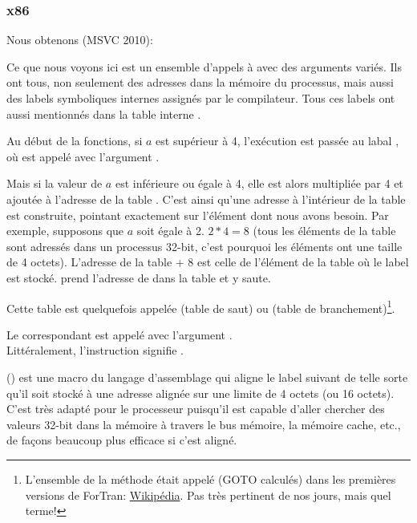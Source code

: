 \subsubsection{x86}


Nous obtenons (MSVC 2010):




Ce que nous voyons ici est un ensemble d'appels à \printf avec des arguments variés.
Ils ont tous, non seulement des adresses dans la mémoire du processus, mais aussi
des labels symboliques internes assignés par le compilateur.
Tous ces labels ont aussi mentionnés dans la table interne .

Au début de la fonctions, si $a$ est supérieur à 4, l'exécution est passée au
labal , où \printf est appelé avec l'argument .

Mais si la valeur de $a$ est inférieure ou égale à 4, elle est alors multipliée
par 4 et ajoutée à l'adresse de la table . C'est ainsi qu'une adresse
à l'intérieur de la table est construite, pointant exactement sur l'élément dont
nous avons besoin. Par exemple, supposons que $a$ soit égale à 2. $2*4 = 8$ (tous
les éléments de la table sont adressés dans un processus 32-bit, c'est pourquoi les
éléments ont une taille de 4 octets).
L'adresse de la table  + 8 est celle de l'élément de la table où
le label  est stocké.
\JMP prend l'adresse de  dans la table et y saute.

Cette table est quelquefois appelée  (table de saut) ou 
(table de branchement)\footnote{L'ensemble de la méthode était appelé  (GOTO calculés) dans les premières versions de ForTran:
\href{http://go.yurichev.com/17122}{Wikipédia}.
Pas très pertinent de nos jours, mais quel terme!}.

Le \printf correspondant est appelé avec l'argument .\\
Littéralement, l'instruction  signifie
 .

 () est une macro du langage d'assemblage qui aligne le
label suivant de telle sorte qu'il soit stocké à une adresse alignée sur une limite
de 4 octets (ou 16 octets).
C'est très adapté pour le processeur puisqu'il est capable d'aller chercher des
valeurs 32-bit dans la mémoire à travers le bus mémoire, la mémoire cache, etc.,
de façons beaucoup plus efficace si c'est aligné.

